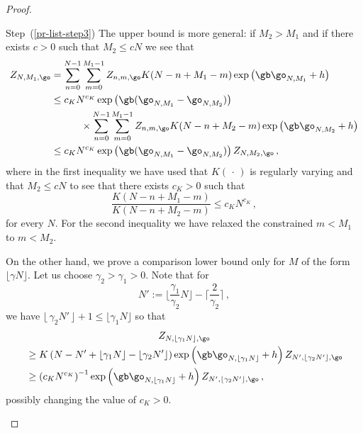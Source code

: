 \begin{proof}
\begin{step}{Step~(\ref{pr-list-step3})}
The upper bound is more general: if $M_2> M_1$ and if there exists $c>0$ such that $M_2 \le c N$ we see that
\begin{equation}\label{eq:comparison-upper}
\begin{split}
Z_{N, M_1, \go} & = \sum_{n=0}^{N-1} \sum_{m=0}^{M_1-1} Z_{n, m, \go} K(N-n+M_1-m) \exp\left(\gb \go_{N, M_1} +h\right)
\\
&\le c_K N^{c_K} \exp\left(\gb (\go_{N, M_1}-\go_{N, M_2}) \right)
\\ & \quad \qquad \times
\sum_{n=0}^{N-1} \sum_{m=0}^{M_1-1} Z_{n, m, \go} K(N-n+M_2-m) \exp\left(\gb \go_{N, M_2} +h\right)
\\ &\le c_K N^{c_K} \exp\left(\gb (\go_{N, M_1}-\go_{N, M_2}) \right) Z_{N, M_2, \go}\,,
\end{split}
\end{equation}
where in the first inequality we have used that $K({\,\cdot\,})$ is regularly varying and that $M_2 \le cN$ to see that there exists $c_K>0$ such that
\begin{equation}
\frac{K(N-n+M_1-m)}{K(N-n+M_2-m)} \le c_K N^{c_K}\,,
\end{equation}
for every $N$. For the second inequality we have relaxed the constrained $m< M_1$ to $m<M_2$.

On the other hand, we prove a comparison lower bound only for $M$ of the form $\lfloor \gamma N \rfloor$. Let us choose $\gamma_2>\gamma_1>0$. Note that for
\begin{equation}
N' := \Big \lfloor \frac{\gamma_1}{\gamma_2}N \Big \rfloor - \Big \lceil \frac{2}{\gamma_2} \Big \rceil\,,
\end{equation}
we have $\lfloor\,\gamma_2 N'\,\rfloor +1 \le \lfloor \gamma_1 N \rfloor $ so that
\begin{multline}\label{eq:comparison-lower}
Z_{N, \lfloor \gamma_1 N \rfloor, \go}\\
\begin{aligned}
&\ge K\left(N-N'+ \lfloor \gamma_1 N \rfloor -\lfloor \gamma_2 N' \rfloor\right)
\exp\left(\gb\go_{N, \lfloor \gamma_1 N \rfloor }+h\right) Z_{N', \lfloor \gamma_2 N' \rfloor, \go}
\\
&\ge \left(c_K N^{c_K}\right)^{-1} \exp\left(\gb\go_{N, \lfloor \gamma_1 N \rfloor }+h\right) Z_{N', \lfloor \gamma_2 N' \rfloor, \go}\,,
\end{aligned}
\end{multline}
possibly changing the value of $c_K>0$.


\end{step}
\end{proof}
